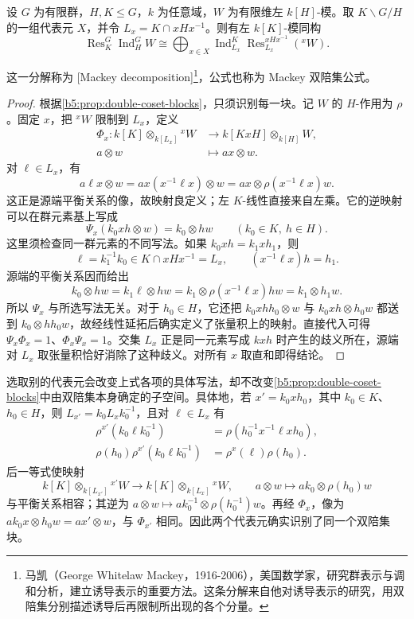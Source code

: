 \begin{theorem}[Mackey 分解]\label{b5:thm:mackey-decomposition}
	设 \(G\) 为有限群，\(H,K\leq G\)，\(k\) 为任意域，\(W\) 为有限维左 \(k[H]\)-模。取 \(K\backslash G/H\) 的一组代表元 \(X\)，并令 \(L_x=K\cap xHx^{-1}\)。则有左 \(k[K]\)-模同构
	\begin{equation}\label{b5:eq:mackey-decomposition}
		\operatorname{Res}_K^G\operatorname{Ind}_H^G W \cong \bigoplus_{x\in X} \operatorname{Ind}_{L_x}^K \operatorname{Res}_{L_x}^{xHx^{-1}}({}^xW).
	\end{equation}
\end{theorem}
这一分解称为 [Mackey decomposition]\footnote{马凯（George Whitelaw Mackey，1916-2006），美国数学家，研究群表示与调和分析，建立诱导表示的重要方法。这条分解来自他对诱导表示的研究，用双陪集分别描述诱导后再限制所出现的各个分量。}，公式也称为 Mackey 双陪集公式。
\begin{proof}
	根据\cref{b5:prop:double-coset-blocks}，只须识别每一块。记 \(W\) 的 \(H\)-作用为 \(\rho\)。固定 \(x\)，把 \({}^xW\) 限制到 \(L_x\)，定义
	\[
		\begin{aligned}
			\Phi_x:k[K]\otimes_{k[L_x]}{}^xW &\longrightarrow k[KxH]\otimes_{k[H]}W,\\
			a\otimes w&\longmapsto ax\otimes w.
		\end{aligned}
	\]
	对 \(\ell\in L_x\)，有
	\[
		a\ell x\otimes w =ax(x^{-1}\ell x)\otimes w =ax\otimes\rho(x^{-1}\ell x)w.
	\]
	这正是源端平衡关系的像，故映射良定义；左 \(K\)-线性直接来自左乘。它的逆映射可以在群元素基上写成
	\[
		\Psi_x(k_0xh\otimes w)=k_0\otimes hw \qquad(k_0\in K,\ h\in H).
	\]
	这里须检查同一群元素的不同写法。如果 \(k_0xh=k_1xh_1\)，则
	\[
		\ell=k_1^{-1}k_0\in K\cap xHx^{-1}=L_x, \qquad (x^{-1}\ell x)h=h_1.
	\]
	源端的平衡关系因而给出
	\[
		k_0\otimes hw =k_1\ell\otimes hw =k_1\otimes\rho(x^{-1}\ell x)hw =k_1\otimes h_1w.
	\]
	所以 \(\Psi_x\) 与所选写法无关。对于 \(h_0\in H\)，它还把 \(k_0xhh_0\otimes w\) 与 \(k_0xh\otimes h_0w\) 都送到 \(k_0\otimes hh_0w\)，故经线性延拓后确实定义了张量积上的映射。直接代入可得 \(\Psi_x\Phi_x=1\)、\(\Phi_x\Psi_x=1\)。交集 \(L_x\) 正是同一元素写成 \(kxh\) 时产生的歧义所在，源端对 \(L_x\) 取张量积恰好消除了这种歧义。对所有 \(x\) 取直和即得结论。
\end{proof}

选取别的代表元会改变上式各项的具体写法，却不改变\cref{b5:prop:double-coset-blocks}中由双陪集本身确定的子空间。具体地，若 \(x'=k_0xh_0\)，其中 \(k_0\in K\)、\(h_0\in H\)，则 \(L_{x'}=k_0L_xk_0^{-1}\)，且对 \(\ell\in L_x\) 有
\[
	\begin{aligned}
		\rho^{x'}(k_0\ell k_0^{-1}) &=\rho(h_0^{-1}x^{-1}\ell xh_0),\\
		\rho(h_0)\rho^{x'}(k_0\ell k_0^{-1}) &=\rho^x(\ell)\rho(h_0).
	\end{aligned}
\]
后一等式使映射
\[
	k[K]\otimes_{k[L_{x'}]}{}^{x'}W \longrightarrow k[K]\otimes_{k[L_x]}{}^xW, \qquad a\otimes w\longmapsto ak_0\otimes\rho(h_0)w
\]
与平衡关系相容；其逆为 \(a\otimes w\mapsto ak_0^{-1}\otimes\rho(h_0^{-1})w\)。再经 \(\Phi_x\)，像为 \(ak_0x\otimes h_0w=ax'\otimes w\)，与 \(\Phi_{x'}\) 相同。因此两个代表元确实识别了同一个双陪集块。

